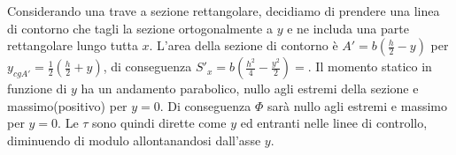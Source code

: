 Considerando una trave a sezione rettangolare, decidiamo di prendere una linea di contorno che tagli la sezione ortogonalmente a $y$ e ne includa una parte rettangolare lungo tutta $x$. L'area della sezione di contorno è $A' = b\left( \frac{h}{2}-y\right)$ per $y_{cgA'} = \frac{1}{2}\left( \frac{h}{2}+y\right)$, di conseguenza  $S'_x = b\left( \frac{h^2}{4} - \frac{y^2}{2}\right) = $. Il momento statico in funzione di $y$ ha un andamento parabolico, nullo agli estremi della sezione e massimo(positivo) per $y=0$. Di conseguenza $\Phi$ sarà nullo agli estremi e massimo per $y=0$. Le $\tau$ sono quindi dirette come $y$ ed entranti nelle linee di controllo, diminuendo di modulo allontanandosi dall'asse $y$.














